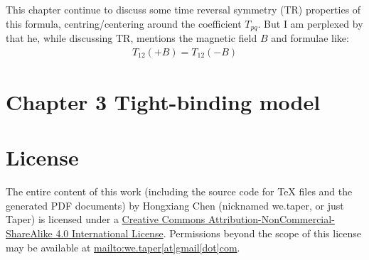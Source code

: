\documentclass{article}
\numberwithin{equation}{subsection} %
\theoremstyle{definition}
\begin{document}
This chapter continue to discuss some time reversal symmetry (TR) properties 
of this formula, centring/centering around the coefficient $T_{pq}$.
But I am perplexed by that he, while discussing TR, mentions the
magnetic field $B$ and formulae like:
\begin{align}
    T_{12}(+B)= T_{12}(-B)
\end{align}

\section{Chapter 3 Tight-binding model}
\label{sec:Chapter_3_Tight-binding_model}

\printnomenclature
\section{License}
The entire content of this work (including the source code
for TeX files and the generated PDF documents) by 
Hongxiang Chen (nicknamed we.taper, or just Taper) is
licensed under a 
\href{http://creativecommons.org/licenses/by-nc-sa/4.0/}{Creative 
Commons Attribution-NonCommercial-ShareAlike 4.0 International 
License}. Permissions beyond the scope of this 
license may be available at \url{mailto:we.taper[at]gmail[dot]com}.
\end{document}
